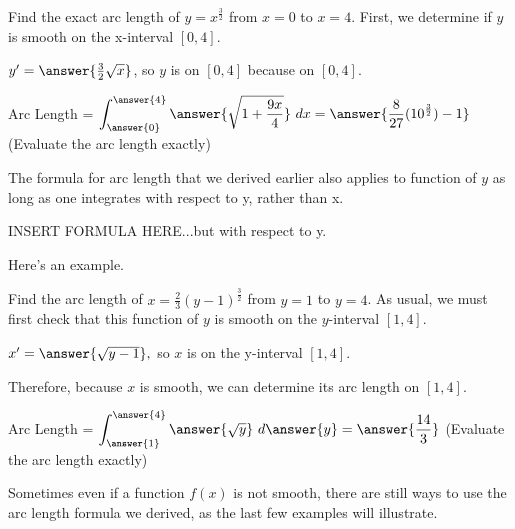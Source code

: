 \documentclass[handout,nooutcomes]{ximera}
\begin{document}

\begin{problem}

Find the exact arc length of $y = x^{\frac{3}{2}}$ from $x=0$ to $x=4$.  First, we determine if $y$ is smooth on the x-interval $[0,4]$.  

$y' = \answer{\frac{3}{2}\sqrt{x}}$, so $y$ is  on $[0,4]$ because  on $[0,4]$.  

\begin{problem}

Arc Length = $\displaystyle\int_{\answer{0}}^{\answer{4}} \answer{\sqrt{1+\frac{9x}{4}}} \ dx = \answer{\frac{8}{27}(10^{\frac{3}{2}})-1}$ (Evaluate the arc length exactly)

\end{problem}
\end{problem}

The formula for arc length that we derived earlier also applies to function of $y$ as long as one integrates with respect to y, rather than x.  

INSERT FORMULA HERE...but with respect to y. 


Here's an example.  


\begin{problem}
Find the arc length of $x = \frac{2}{3} (y-1)^{\frac{3}{2}}$ from $y=1$ to $y=4$.  As usual, we must first check that this function of $y$ is smooth on the $y$-interval $[1,4]$.  

$x' = \answer{\sqrt{y-1}},$ so $x$ is  on the y-interval $[1,4]$.

\begin{problem}
Therefore, because $x$ is smooth, we can determine its arc length on $[1,4]$.

Arc Length = $\displaystyle\int_{\answer{1}}^{\answer{4}} \answer{\sqrt{y}} \ d\answer{y} = \answer{\frac{14}{3}}$ (Evaluate the arc length exactly)

\end{problem}

\end{problem}

Sometimes even if a function $f(x)$ is not smooth, there are still ways to use the arc length formula we derived, as the last few examples will illustrate.
\end{document}
